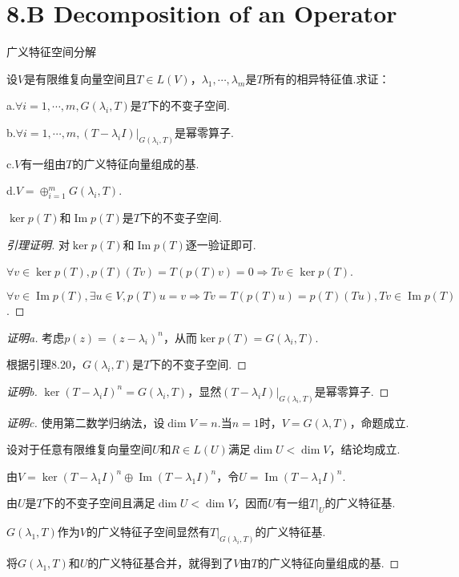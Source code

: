 \section{8.B Decomposition of an Operator}

\begin{theorem}[8.21]\label{thm 8.21} 广义特征空间分解 \:
    
    设\(V\)是有限维复向量空间且\(T \in L(V)\)，\(\lambda_1,\cdots,\lambda_m\)是\(T\)所有的相异特征值.求证：

    a.\(\forall i=1,\cdots,m,G(\lambda_i,T)\)是\(T\)下的不变子空间.
    
    b.\(\forall i=1,\cdots,m,(T-\lambda_i I)|_{G(\lambda_i,T)}\)是幂零算子.
    
    c.\(V\)有一组由\(T\)的广义特征向量组成的基.
    
    d.\(V=\oplus_{i=1}^m G(\lambda_i,T)\).
\end{theorem}

\begin{lemma}[8.20]\label{lem 8.20}
    \(\ker p(T)\)和\(\operatorname{Im} p(T)\)是\(T\)下的不变子空间.
\end{lemma}

\begin{proof}[引理证明]
    对\(\ker p(T)\)和\(\operatorname{Im} p(T)\)逐一验证即可.

    \(\forall v \in \ker p(T),p(T)(Tv)=T(p(T)v)=0 \Rightarrow Tv \in \ker p(T)\).
    
    \(\forall v \in \operatorname{Im} p(T),\exists u \in V,p(T)u=v \Rightarrow Tv=T(p(T)u)=p(T)(Tu),Tv \in \operatorname{Im} p(T)\).
\end{proof}

\begin{proof}[证明a]
    考虑\(p(z)=(z-\lambda_i)^n\)，从而\(\ker p(T)=G(\lambda_i,T)\).

    根据引理8.20，\(G(\lambda_i,T)\)是\(T\)下的不变子空间.
\end{proof}

\begin{proof}[证明b]
    \(\ker (T-\lambda_i I)^n=G(\lambda_i,T)\)，显然\((T-\lambda_i I)|_{G(\lambda_i,T)}\)是幂零算子.
\end{proof}

\begin{proof}[证明c]
    使用第二数学归纳法，设\(\dim V=n\).当\(n=1\)时，\(V=G(\lambda,T)\)，命题成立.

    设对于任意有限维复向量空间\(U\)和\(R \in L(U)\)满足\(\dim U<\dim V\)，结论均成立.
    
    由\(V=\ker (T-\lambda_1 I)^n \oplus \operatorname{Im} (T-\lambda_1 I)^n\)，令\(U=\operatorname{Im} (T-\lambda_1 I)^n\).
    
    由\(U\)是\(T\)下的不变子空间且满足\(\dim U<\dim V\)，因而\(U\)有一组\(T|_U\)的广义特征基.
    
    \(G(\lambda_1,T)\)作为\(V\)的广义特征子空间显然有\(T|_{G(\lambda_i,T)}\)的广义特征基.
    
    将\(G(\lambda_1,T)\)和\(U\)的广义特征基合并，就得到了\(V\)由\(T\)的广义特征向量组成的基.
\end{proof}

